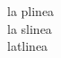 \documentclass[10pt,a4paper]{book}
\begin{document}




la plinea \\
la slinea \\
latlinea \\
\end{document}
